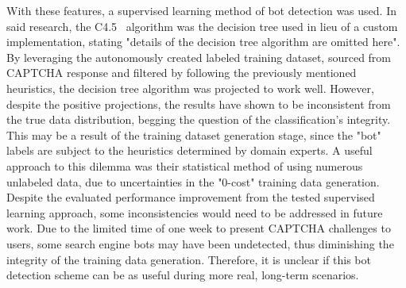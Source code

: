 With these features, a supervised learning method of bot detection was used.
In said research, the C4.5~\cite{c4.5} algorithm was the decision tree used in lieu of a custom implementation, stating "details of the decision tree algorithm are omitted here".
By leveraging the autonomously created labeled training dataset, sourced from CAPTCHA response and filtered by following the previously mentioned heuristics, the decision tree algorithm was projected to work well.
However, despite the positive projections, the results have shown to be inconsistent from the true data distribution, begging the question of the classification's integrity.
This may be a result of the training dataset generation stage, since the "bot" labels are subject to the heuristics determined by domain experts.
A useful approach to this dilemma was their statistical method of using numerous unlabeled data, due to uncertainties in the "0-cost" training data generation.
Despite the evaluated performance improvement from the tested supervised learning approach, some inconsistencies would need to be addressed in future work.
Due to the limited time of one week to present CAPTCHA challenges to users, some search engine bots may have been undetected, thus diminishing the integrity of the training data generation.
Therefore, it is unclear if this bot detection scheme can be as useful during more real, long-term scenarios.
